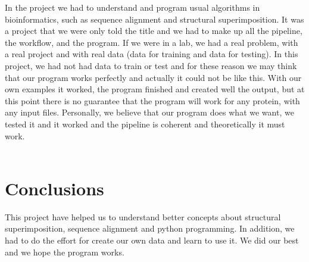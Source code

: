 \documentclass[a4paper,12pt]{report}
\begin{document}
In the project we had to understand and program usual algorithms in bioinformatics, such as sequence alignment and structural superimposition. It was a project that we were only told the title and we had to make up all the pipeline, the workflow, and the program.
If we were in a lab, we had a real problem, with a real project and with real data (data for training and data for testing). In this project, we had not had data to train or test and for these reason we may think that our program works perfectly and actually it could not be like this. With our own examples it worked, the program finished and created well the output, but at this point there is no guarantee that the program will work for any protein, with any input files. Personally, we believe that our program does what we want, we tested it and it worked and the pipeline is coherent and theoretically it must work.\\\\

\chapter{Conclusions}

This project have helped us to understand better concepts about structural superimposition, sequence alignment and python programming. In addition, we had to do the effort for create our own data and learn to use it. We did our best and we hope the program works.



\end{document}
